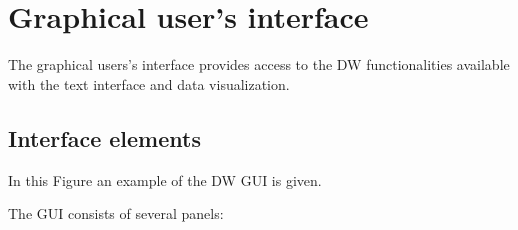 \documentclass[letterpaper,10pt,english]{sphinxmanual}
\begin{document}
\section{Graphical user's interface}
\label{gui::doc}\label{gui:graphical-user-s-interface}
The graphical users's interface provides access to the DW functionalities available
with the text interface and data visualization.


\subsection{Interface elements}
\label{gui:interface-elements}
In this Figure an example of the DW GUI is given.


The GUI consists of several panels:
\end{document}
